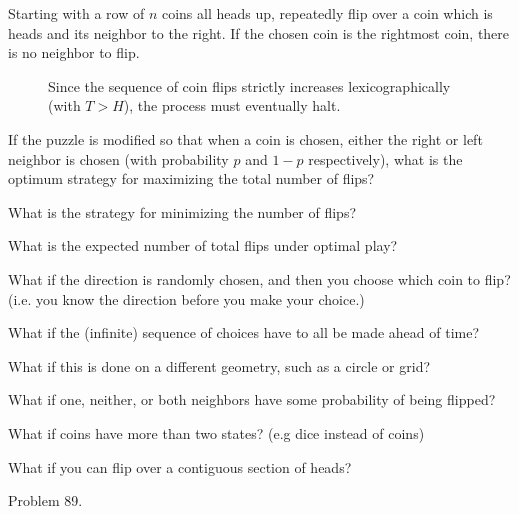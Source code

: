 \documentclass{article}
\begin{document}
Starting with a row of $n$ coins all heads up, repeatedly flip over a coin which
is heads and its neighbor to the right. If the chosen coin is the rightmost
coin, there is no neighbor to flip.

\begin{figure}[ht!]
  \centering
  \caption{
    Since the sequence of coin flips strictly increases lexicographically
    (with $T > H$), the process must eventually halt.
  }
\end{figure}
\begin{question}
  If the puzzle is modified so that when a coin is chosen, either the right or
  left neighbor is chosen (with probability $p$ and $1 - p$ respectively),
  what is the optimum strategy for maximizing the total number of flips?
\end{question}

\begin{related}
  \item What is the strategy for minimizing the number of flips?
  \item What is the expected number of total flips under optimal play?
  \item What if the direction is randomly chosen, and then you choose which
  coin to flip? (i.e. you know the direction before you make your choice.)
  \item What if the (infinite) sequence of choices have to all be made ahead of
  time?
  \item What if this is done on a different geometry, such as a circle or grid?
  \item What if one, neither, or both neighbors have some probability of being
    flipped?
  \item What if coins have more than two states? (e.g dice instead of coins)
  \item What if you can flip over a contiguous section of heads?
\end{related}

\begin{references}
  \item Problem 89.
\end{references}
\end{document}
